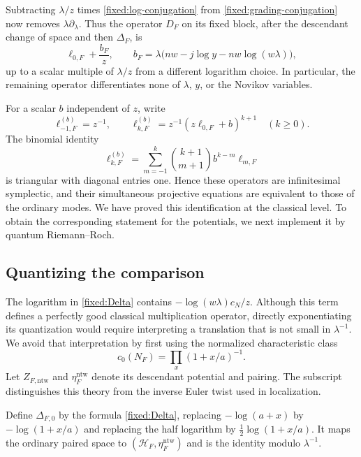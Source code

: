Subtracting $\lambda/z$ times \eqref{fixed:log-conjugation} from
\eqref{fixed:grading-conjugation} now removes
$\lambda\partial_\lambda$.  Thus the operator $D_F$ on its fixed block,
after the descendant change of space and then $\Delta_F$, is
\begin{equation}\label{fixed:ordinary-grading}
 \ell_{0,F}+\frac{b_F}{z},\qquad
 b_F=\lambda\bigl(nw-j\log y-nw\log(w\lambda)\bigr),
\end{equation}
up to a scalar multiple of $\lambda/z$ from a different logarithm
choice.  In particular, the remaining operator differentiates none of
$\lambda$, $y$, or the Novikov variables.

For a scalar $b$ independent of $z$, write
\[
 \ell_{-1,F}^{(b)}=z^{-1},\qquad
 \ell_{k,F}^{(b)}=z^{-1}(z\ell_{0,F}+b)^{k+1}\quad(k\geq0).
\]
The binomial identity
\begin{equation}\label{fixed:binomial}
 \ell_{k,F}^{(b)}=
   \sum_{m=-1}^{k}\binom{k+1}{m+1}b^{k-m}\ell_{m,F}
\end{equation}
is triangular with diagonal entries one.  Hence these operators are
infinitesimal symplectic, and their simultaneous projective equations
are equivalent to those of the ordinary modes.  We have proved this
identification at the classical level.  To obtain the corresponding
statement for the potentials, we next implement it by quantum
Riemann--Roch.

\subsection{Quantizing the comparison}

The logarithm in \eqref{fixed:Delta} contains
$-\log(w\lambda)c_N/z$.  Although this term defines a perfectly good
classical multiplication operator, directly exponentiating its
quantization would require interpreting a translation that is not small
in $\lambda^{-1}$.  We avoid that interpretation by first using the
normalized characteristic class
\begin{equation}\label{fixed:normalized-class}
 c_0(N_F)=\prod_x(1+x/a)^{-1}.
\end{equation}
Let $Z_{F,\mathrm{ntw}}$ and $\eta_F^{\mathrm{ntw}}$ denote its descendant
potential and pairing.  The subscript distinguishes this theory from
the inverse Euler twist used in localization.

Define $\Delta_{F,0}$ by the formula \eqref{fixed:Delta}, replacing
$-\log(a+x)$ by $-\log(1+x/a)$ and replacing the half logarithm by
$\tfrac12\log(1+x/a)$.  It maps the ordinary paired space to
$(\mathcal H_F,\eta_F^{\mathrm{ntw}})$ and is the identity modulo
$\lambda^{-1}$.

